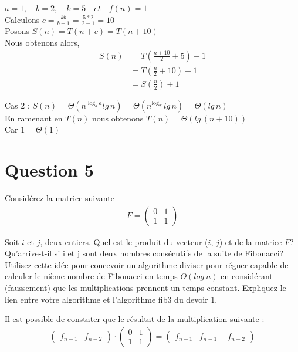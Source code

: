 \documentclass[12pt]{article}
\begin{document}
\(a=1, \quad b=2, \quad k=5 \quad et \quad f(n) = 1\) \\

Calculons \(c = \frac{kb}{b-1} = \frac{5*2}{2-1} = 10\) \\

Posons \(S(n) = T(n+c) = T(n+10) \) \\

Nous obtenons alors, 
\begin{align*}
	S(n) &= T(\frac{n+10}{2}+5)+1 \\
	&= T(\frac{n}{2}+10)+1 \\
	&= S(\frac{n}{2}) + 1
\end{align*}

Cas 2 : \(S(n) = \Theta(n^{\log_ba}lg \, n) = \Theta(n^{\log_21}lg \, n) = \Theta(lg \, n) \) \\
En ramenant en \(T(n)\) nous obtenons \(T(n)=\Theta(lg \, (n+10))\) \\

Car \(1 = \Theta(1)\) \\
\newpage

\section*{Question 5}
Considérez la matrice suivante
\begin{align*}
	F =
	\begin{pmatrix}
		0 & 1 \\
		1 & 1
	\end{pmatrix}
\end{align*}

Soit \(i\) et \(j\), deux entiers. Quel est le produit du vecteur (\(i\), \(j\)) et de la matrice \(F\)? Qu’arrive-t-il si i et j sont deux nombres consécutifs de la suite de Fibonacci? Utilisez cette idée pour concevoir un algorithme diviser-pour-régner capable de calculer le nième nombre de Fibonacci en temps \(\Theta (log \: n)\) en considérant (faussement) que les multiplications prennent un temps constant. Expliquez le lien entre votre algorithme et l’algorithme fib3 du devoir 1. \newline

Il est possible de constater que le résultat de la multiplication suivante :
\begin{align*}
	\begin{pmatrix}
		f_{n-1} & f_{n-2}
	\end{pmatrix}
	\cdot
	\begin{pmatrix}
		0 & 1 \\
		1 & 1
	\end{pmatrix}
	=
	\begin{pmatrix}
		f_{n-1} & f_{n-1} + f_{n-2}
	\end{pmatrix}
\end{align*}
\end{document}
